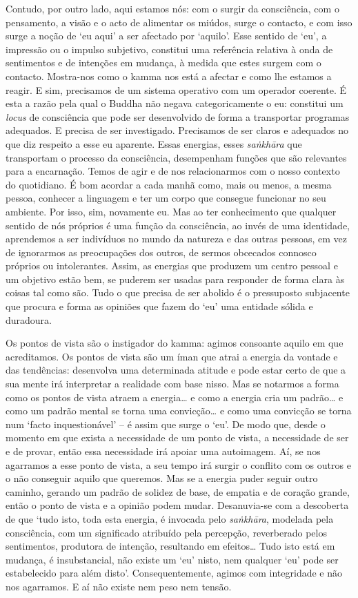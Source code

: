 Contudo, por outro lado, aqui estamos nós: com o surgir da consciência, com o
pensamento, a visão e o acto de alimentar os miúdos, surge o contacto, e com
isso surge a noção de `eu aqui' a ser afectado por `aquilo'. Esse sentido de
`eu', a impressão ou o impulso subjetivo, constitui uma referência relativa à
onda de sentimentos e de intenções em mudança, à medida que estes surgem com o
contacto. Mostra-nos como o kamma nos está a afectar e como lhe estamos a
reagir. E sim, precisamos de um sistema operativo com um operador coerente. É
esta a razão pela qual o Buddha não negava categoricamente o eu: constitui um
\emph{locus} de consciência que pode ser desenvolvido de forma a transportar
programas adequados. E precisa de ser investigado. Precisamos de ser claros e
adequados no que diz respeito a esse eu aparente. Essas energias, esses
\emph{saṅkhāra} que transportam o processo da consciência, desempenham funções
que são relevantes para a encarnação. Temos de agir e de nos relacionarmos com o
nosso contexto do quotidiano. É bom acordar a cada manhã como, mais ou menos, a
mesma pessoa, conhecer a linguagem e ter um corpo que consegue funcionar no seu
ambiente. Por isso, sim, novamente eu. Mas ao ter conhecimento que qualquer
sentido de nós próprios é uma função da consciência, ao invés de uma identidade,
aprendemos a ser indivíduos no mundo da natureza e das outras pessoas, em vez de
ignorarmos as preocupações dos outros, de sermos obcecados connosco próprios ou
intolerantes. Assim, as energias que produzem um centro pessoal e um objetivo
estão bem, se puderem ser usadas para responder de forma clara às coisas tal
como são. Tudo o que precisa de ser abolido é o pressuposto subjacente que
procura e forma as opiniões que fazem do `eu' uma entidade sólida e duradoura.

Os pontos de vista são o instigador do kamma: agimos consoante aquilo em que
acreditamos. Os pontos de vista são um íman que atrai a energia da vontade e das
tendências: desenvolva uma determinada atitude e pode estar certo de que a sua
mente irá interpretar a realidade com base nisso. Mas se notarmos a forma como
os pontos de vista atraem a energia\ldots{} e como a energia cria um padrão\ldots{} e como
um padrão mental se torna uma convicção\ldots{} e como uma convicção se torna num
`facto inquestionável' -- é assim que surge o `eu'. De modo que, desde o momento
em que exista a necessidade de um ponto de vista, a necessidade de ser e de
provar, então essa necessidade irá apoiar uma autoimagem. Aí, se nos agarramos a
esse ponto de vista, a seu tempo irá surgir o conflito com os outros e o não
conseguir aquilo que queremos. Mas se a energia puder seguir outro caminho,
gerando um padrão de solidez de base, de empatia e de coração grande, então o
ponto de vista e a opinião podem mudar. Desanuvia-se com a descoberta de que
`tudo isto, toda esta energia, é invocada pelo \emph{saṅkhāra}, modelada pela
consciência, com um significado atribuído pela percepção, reverberado pelos
sentimentos, produtora de intenção, resultando em efeitos\ldots{} Tudo isto está em
mudança, é insubstancial, não existe um `eu' nisto, nem qualquer `eu' pode ser
estabelecido para além disto'. Consequentemente, agimos com integridade e não
nos agarramos. E aí não existe nem peso nem tensão.
